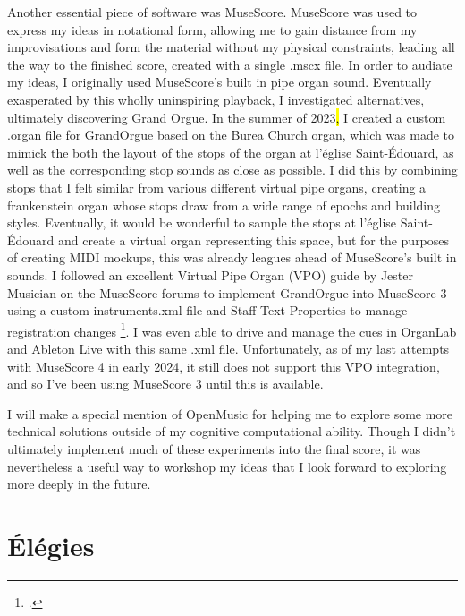 \documentclass[12pt,twoside,maitrise]{dms_ks}
\theoremstyle{definition}
\begin{document}
{Another essential piece of software was MuseScore. 
MuseScore was used to express my ideas in notational form, allowing me to gain distance from my improvisations and form the material without my physical constraints, leading all the way to the finished score, created with a single .mscx file. 
In order to audiate my ideas, I originally used MuseScore's built in pipe organ sound. 
Eventually exasperated by this wholly uninspiring playback, I investigated alternatives, ultimately discovering Grand Orgue. 
In the summer of 2023\hl{,} I created a custom .organ file for GrandOrgue based on the Burea Church organ, which was made to mimick the both the layout of the stops of the organ at l'église Saint-Édouard, as well as the corresponding stop sounds as close as possible. 
I did this by combining stops that I felt similar from various different virtual pipe organs, creating a frankenstein organ whose stops draw from a wide range of epochs and building styles. 
Eventually, it would be wonderful to sample the stops at l'église Saint-Édouard and create a virtual organ representing this space, but for the purposes of creating MIDI mockups, this was already leagues ahead of MuseScore's built in sounds. 
I followed an excellent Virtual Pipe Organ (VPO) guide by Jester Musician on the MuseScore forums to implement GrandOrgue into MuseScore 3 using a custom instruments.xml file and Staff Text Properties to manage registration changes \footcite{musician_jester_how_2018}. 
I was even able to drive and manage the cues in OrganLab and Ableton Live with this same .xml file. 
Unfortunately, as of my last attempts with MuseScore 4 in early 2024, it still does not support this VPO integration, and so I've been using MuseScore 3 until this is available.


I will make a special mention of OpenMusic for helping me to explore some more technical solutions outside of my cognitive computational ability. 
Though I didn't ultimately implement much of these experiments into the final score, it was nevertheless a useful way to workshop my ideas that I look forward to exploring more deeply in the future.

\chapter{Élégies}

}
\end{document}
